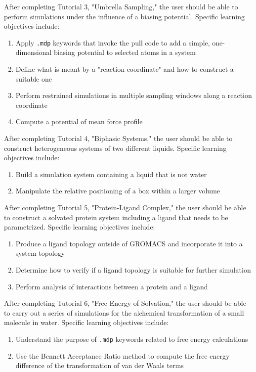 \documentclass[9pt,tutorial]{livecoms}
\begin{document}
After completing Tutorial 3, "Umbrella Sampling," the user should be able to perform simulations under the influence of a biasing potential. Specific learning objectives include:
\begin{enumerate}
	\item Apply \texttt{.mdp} keywords that invoke the pull code to add a simple, one-dimensional biasing potential to selected atoms in a system
	\item Define what is meant by a "reaction coordinate" and how to construct a suitable one
	\item Perform restrained simulations in multiple sampling windows along a reaction coordinate
	\item Compute a potential of mean force profile
\end{enumerate}

After completing Tutorial 4, "Biphasic Systems," the user should be able to construct heterogeneous systems of two different liquids. Specific learning objectives include:
\begin{enumerate}
	\item Build a simulation system containing a liquid that is not water
	\item Manipulate the relative positioning of a box within a larger volume
\end{enumerate}

After completing Tutorial 5, "Protein-Ligand Complex," the user should be able to construct a solvated protein system including a ligand that needs to be parametrized. Specific learning objectives include:
\begin{enumerate}
	\item Produce a ligand topology outside of GROMACS and incorporate it into a system topology
	\item Determine how to verify if a ligand topology is suitable for further simulation
	\item Perform analysis of interactions between a protein and a ligand
\end{enumerate}

After completing Tutorial 6, "Free Energy of Solvation," the user should be able to carry out a series of simulations for the alchemical transformation of a small molecule in water. Specific learning objectives include:
\begin{enumerate}
	\item Understand the purpose of \texttt{.mdp} keywords related to free energy calculations
	\item Use the Bennett Acceptance Ratio method to compute the free energy difference of the transformation of van der Waals terms
\end{enumerate}
\end{document}
